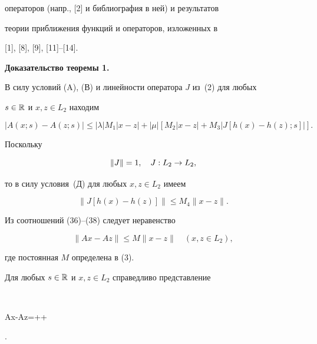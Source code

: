 операторов (напр., [2] и библиография в ней) и результатов


теории приближения функций и операторов, изложенных в


[1], [8], [9], [11]--[14].


\medskip





{\bf Доказательство теоремы 1.}


В силу условий (A), (В) и линейности оператора $J$ из~(2) для любых


$s\in \Bbb R$ и $ x,z\in L_2$ находим


\begin{equation}


|A(x;s)-A(z;s)|\leq |\lambda| M_1|x-z|+|\mu| [M_2|x-z|+


M_3|J[h(x)-h(z);s]|].


\end{equation}


Поскольку


\begin{equation}


\|J\|=1,\quad \operator{J}{L_2}{L_2},


\end{equation}


то в силу условия~(Д) для любых $x,z\in L_2$ имеем


\begin{equation}


\|J[h(x)-h(z)]\|\leq M_4\|x-z\|.


\end{equation}


Из соотношений (36)--(38) следует неравенство


\begin{equation}


\|Ax-Az\|\leq M \|x-z\|\quad (x,z\in L_2),


\end{equation}


где постоянная $M$ определена в (3).





Для любых $s\in \Bbb R$ и $x,z\in L_2$ справедливо представление


$$


Ax-Az=\lambda [F(s,x)-F(s,z)]++


.


